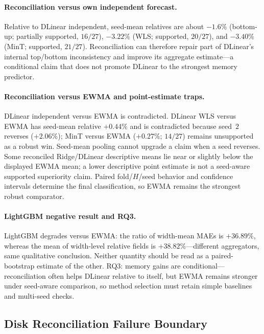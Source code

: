 \documentclass[a4paper,fleqn]{cas-dc}
\begin{document}
\paragraph{Reconciliation versus own independent forecast.}
Relative to DLinear independent, seed-mean relatives are about $-1.6\%$
(bottom-up; partially supported, $16/27$), $-3.22\%$ ({WLS}; supported,
$20/27$), and $-3.40\%$ (MinT; supported, $21/27$).
Reconciliation can therefore repair part of DLinear's internal top/bottom
inconsistency and improve its aggregate estimate---a conditional claim that does
not promote DLinear to the strongest memory predictor.

\paragraph{Reconciliation versus {EWMA} and point-estimate traps.}
DLinear independent versus {EWMA} is contradicted.
DLinear {WLS} versus {EWMA} has seed-mean relative $+0.44\%$ and is
contradicted because seed~$2$ reverses ($+2.06\%$); MinT versus {EWMA}
($+0.27\%$; $14/27$) remains unsupported as a robust win.
Seed-mean pooling cannot upgrade a claim when a seed reverses.
Some reconciled Ridge/DLinear descriptive means lie near or slightly below the
displayed {EWMA} mean; a lower descriptive point estimate is not a seed-aware
supported superiority claim.
Paired fold/$H$/seed behavior and confidence intervals determine the final
classification, so {EWMA} remains the strongest robust comparator.

\paragraph{LightGBM negative result and {RQ3}.}
LightGBM degrades versus {EWMA}: the ratio of width-mean {MAE}s is $+36.89\%$,
whereas the mean of width-level relative fields is $+38.82\%$---different
aggregators, same qualitative conclusion.
Neither quantity should be read as a paired-bootstrap estimate of the other.
{RQ3}: memory gains are conditional---reconciliation often helps DLinear
relative to itself, but {EWMA} remains stronger under seed-aware comparison, so
method selection must retain simple baselines and multi-seed checks.



\subsection{Disk Reconciliation Failure Boundary}
\label{sec:disk}
\end{document}
